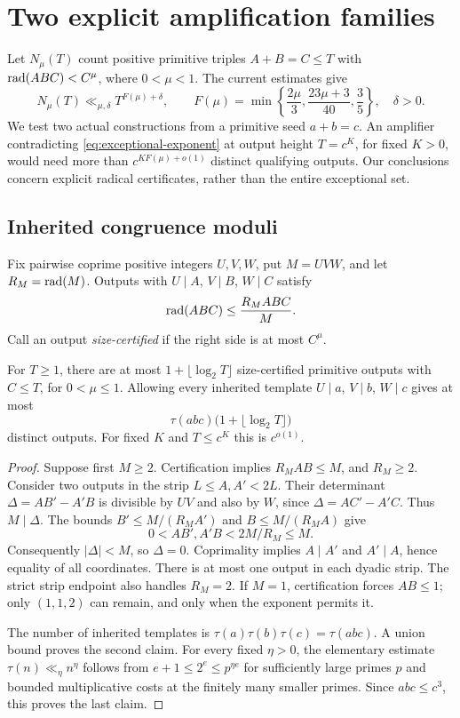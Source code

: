 \section{Two explicit amplification families}\label{sec:amplification}

Let $N_\mu(T)$ count positive primitive triples $A+B=C\le T$ with
$\operatorname{rad}(ABC)<C^\mu$, where $0<\mu<1$. The current estimates
\cite[Proposition~1.1 and Theorems~1.2--1.3]{BBLT} give
\begin{equation}\label{eq:exceptional-exponent}
 N_\mu(T)\ll_{\mu,\delta}T^{F(\mu)+\delta},\qquad
 F(\mu)=\min\left\{\frac{2\mu}{3},\frac{23\mu+3}{40},\frac35\right\},
 \quad\delta>0.
\end{equation}
We test two actual constructions from a primitive seed $a+b=c$.
An amplifier contradicting \eqref{eq:exceptional-exponent} at output
height $T=c^K$, for fixed $K>0$, would need more than
$c^{KF(\mu)+o(1)}$ distinct qualifying outputs. Our conclusions concern
explicit radical certificates, rather than the entire exceptional set.

\subsection{Inherited congruence moduli}
Fix pairwise coprime positive integers $U,V,W$, put $M=UVW$, and let
$R_M=\operatorname{rad}(M)$. Outputs with $U\mid A$, $V\mid B$, $W\mid C$ satisfy
\[
 \operatorname{rad}(ABC)\le\frac{R_MABC}{M}.
\]
Call an output \emph{size-certified} if the right side is at most $C^\mu$.

\begin{proposition}\label{prop:crt-fibre}
For $T\ge1$, there are at most $1+\lfloor\log_2T\rfloor$
size-certified primitive outputs with $C\le T$, for $0<\mu\le1$.
Allowing every inherited template $U\mid a$, $V\mid b$, $W\mid c$
gives at most
\[
 \tau(abc)\bigl(1+\lfloor\log_2T\rfloor\bigr)
\]
distinct outputs. For fixed $K$ and $T\le c^K$ this is $c^{o(1)}$.
\end{proposition}
\begin{proof}
Suppose first $M\ge2$. Certification implies $R_MAB\le M$, and
$R_M\ge2$. Consider two outputs in the strip $L\le A,A'<2L$.
Their determinant $\Delta=AB'-A'B$ is divisible by $UV$ and also by $W$,
since $\Delta=AC'-A'C$. Thus $M\mid\Delta$.
The bounds $B'\le M/(R_MA')$ and $B\le M/(R_MA)$ give
\[
 0<AB',A'B<2M/R_M\le M.
\]
Consequently $|\Delta|<M$, so $\Delta=0$. Coprimality implies
$A\mid A'$ and $A'\mid A$, hence equality of all coordinates.
There is at most one output in each dyadic strip. The strict strip endpoint
also handles $R_M=2$. If $M=1$, certification forces $AB\le1$; only
$(1,1,2)$ can remain, and only when the exponent permits it.

The number of inherited templates is
$\tau(a)\tau(b)\tau(c)=\tau(abc)$. A union bound proves the second claim.
For every fixed $\eta>0$, the elementary estimate
$\tau(n)\ll_\eta n^\eta$ follows from $e+1\le2^e\le p^{\eta e}$
for sufficiently large primes $p$ and bounded multiplicative costs at the
finitely many smaller primes. Since $abc\le c^3$, this proves the last claim.
\end{proof}

